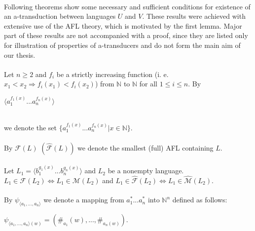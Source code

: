 \paragraph{}
Following theorems show some necessary and sufficient conditions for existence of an a-transduction between languages $U$ and $V$. These results were achieved with extensive use of the AFL theory, which is motivated by the first lemma. Major part of these results are not accompanied with a proof, since they are listed only for illustration of properties of a-transducers and do not form the main aim of our thesis.

\paragraph{}
\oznacenie Let $n \geq 2$ and $f_{i}$ be a strictly increasing function (i. e. $x_{1} < x_{2} \Rightarrow f_{i}(x_{1}) < f_{i}(x_{2})$) from $\mathbb{N} $ to $\mathbb{N} $ for all $ 1 \leq i \leq n$. By \\
\centerline{$\langle a_{1}^{f_{1}(x)}...a_{n}^{f_{n}(x)} \rangle $} \\
we denote the set $\{ a_{1}^{f_{1}(x)}...a_{n}^{f_{n}(x)} | x \in \mathbb{N} \} $.

\paragraph{}
\oznacenie By $\mathcal{F}(L) $ $(\hat{\mathcal{F}} (L) )$ we denote the smallest (full) AFL containing $L$.

\paragraph{}
\clema Let $L_{1} = \langle b_{1}^{g_{1}(x)}...b_{n}^{g_{n}(x)} \rangle $ and $L_{2}$ be a nonempty language. $L_{1} \in \mathcal{F}(L_{2}) \Leftrightarrow L_{1} \in \mathcal{M}(L_{2})$ and $L_{1} \in \hat{\mathcal{F}}(L_{2}) \Leftrightarrow L_{1} \in \hat{\mathcal{M}}(L_{2})$.

\paragraph{}
\oznacenie By $\psi_{\langle a_{1},...,a_{n}\rangle }$ we denote a mapping from $a_{1}^{*}...a_{n}^{*}$ into $\mathbb{N}^{n}$ defined as follows: \\
\centerline{$\psi_{\langle a_{1},...,a_{n}\rangle (w) } = (\# _{a_{1}}(w), ..., \# _{a_{n}(w)}) $.}

\paragraph{}
